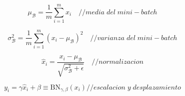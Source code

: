  
 \begin{equation}\label{formula:bn_minibatch_mean}
 \mu_{\mathcal{B}} = \frac{1}{m} \sum_{i=1}^{m} x_{i}
\quad { // media\; del \; mini-batch}
 \end{equation}
 
 \begin{equation}\label{formula:bn_minibatch_variance}
 \sigma_{\mathcal{B}}^{2} = \frac{1}{m} \sum_{i=1}^{m}\left(x_{i}-\mu_{\mathcal{B}}\right)^{2}
\quad { // varianza \; del \; mini-batch}
 \end{equation}
 
 \begin{equation}\label{formula:bn_normalization}
 \widehat{x}_{i} = \frac{x_{i}-\mu_{\mathcal{B}}}{\sqrt{\sigma_{\mathcal{B}}^{2}+\epsilon}}
\quad { // normalizacion}
 \end{equation}
 
 \begin{equation}\label{formula:bn_scale_and_shift}
 y_{i} = \gamma \widehat{x}_{i}+\beta \equiv \mathrm{B} \mathrm{N}_{\gamma, \beta}\left(x_{i}\right) {// escalacion \; y \; desplazamiento}
 \end{equation}
 

